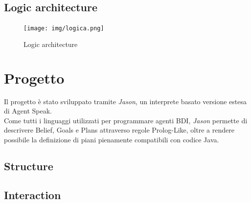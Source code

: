 \documentclass{llncs}
\newcommand{\labelsec}[1]{\label{sec:#1}}
\begin{document}
\subsection{Logic architecture}
\begin{figure}[htbp]
  \centering
   \texttt{[image: img/logica.png]}
  \caption{Logic architecture}
\end{figure}
\newpage
\section{Progetto}
\labelsec{Progetto}
Il progetto è stato sviluppato tramite \textit{Jason}, un interprete basato versione estesa di Agent Speak.\\
Come tutti i linguaggi utilizzati per programmare agenti BDI, \textit{Jason} permette di descrivere Belief, Goals e Plans attraverso regole Prolog-Like, oltre a rendere possibile la definizione di piani pienamente compatibili con codice Java.\\
\newpage
\subsection{Structure}

\subsection{Interaction}
\newpage
\end{document}
